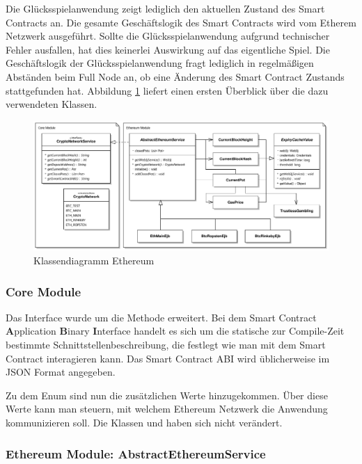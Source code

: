 Die Glücksspielanwendung zeigt lediglich den aktuellen Zustand des Smart Contracts an. Die gesamte Geschäftslogik des Smart Contracts wird vom Etherem Netzwerk ausgeführt. Sollte die Glücksspielanwendung aufgrund technischer Fehler ausfallen, hat dies keinerlei Auswirkung auf das eigentliche Spiel. Die Geschäftslogik der Glücksspielanwendung fragt lediglich in regelmäßigen Abständen beim Full Node an, ob eine Änderung des Smart Contract Zustands stattgefunden hat. Abbildung \ref{fig:eth_business_logic1} liefert einen ersten Überblick über die dazu verwendeten Klassen.

\begin{figure}[H]
\centering
\includegraphics[width=1\linewidth]{Figures/umsetzung_eth/eth_business_logic1}
\decoRule
\caption{Klassendiagramm Ethereum}
\label{fig:eth_business_logic1}
\end{figure}

\subsubsection{Core Module}
Das  Interface wurde um die Methode  erweitert. Bei dem  Smart Contract \textbf{A}pplication \textbf{B}inary \textbf{I}nterface handelt es sich um die statische zur Compile-Zeit bestimmte Schnittstellenbeschreibung, die festlegt wie man mit dem Smart Contract interagieren kann. Das Smart Contract ABI wird üblicherweise im JSON Format angegeben.

Zu dem  Enum sind nun die zusätzlichen Werte  hinzugekommen. Über diese Werte kann man steuern, mit welchem Ethereum Netzwerk die Anwendung kommunizieren soll. 
Die Klassen  und  haben sich nicht verändert.
\subsubsection{Ethereum Module: AbstractEthereumService}

